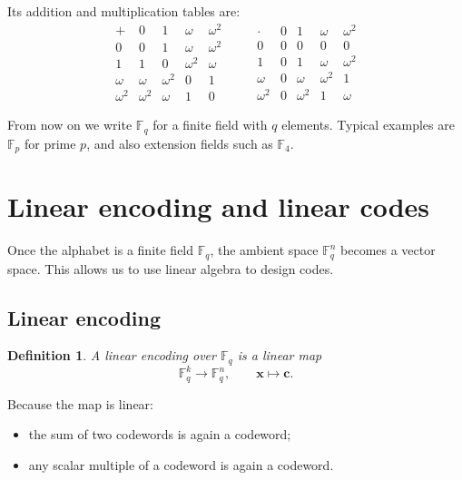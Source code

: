 \documentclass[11pt]{article}
\newtheorem{definition}{Definition}[section]
\newcommand{\F}{\mathbb{F}}
\newcommand{\vect}[1]{\bm{#1}}
\begin{document}
Its addition and multiplication tables are:
\[
\begin{array}{c|cccc}
+ & 0 & 1 & \omega & \omega^2 \\\hline
0 & 0 & 1 & \omega & \omega^2 \\
1 & 1 & 0 & \omega^2 & \omega \\
\omega & \omega & \omega^2 & 0 & 1 \\
\omega^2 & \omega^2 & \omega & 1 & 0
\end{array}
\qquad
\begin{array}{c|cccc}
\cdot & 0 & 1 & \omega & \omega^2 \\\hline
0 & 0 & 0 & 0 & 0 \\
1 & 0 & 1 & \omega & \omega^2 \\
\omega & 0 & \omega & \omega^2 & 1 \\
\omega^2 & 0 & \omega^2 & 1 & \omega
\end{array}
\]

\begin{summarybox}
From now on we write \(\F_q\) for a finite field with \(q\) elements. Typical examples are \(\F_p\) for prime \(p\), and also extension fields such as \(\F_4\).
\end{summarybox}

\section{Linear encoding and linear codes}

Once the alphabet is a finite field \(\F_q\), the ambient space \(\F_q^n\) becomes a vector space. This allows us to use linear algebra to design codes.

\subsection{Linear encoding}

\begin{definition}
A \emph{linear encoding} over \(\F_q\) is a linear map
\[
\F_q^k \longrightarrow \F_q^n,
\qquad
\vect{x}\longmapsto \vect{c}.
\]
\end{definition}

Because the map is linear:
\begin{itemize}
  \item the sum of two codewords is again a codeword;
  \item any scalar multiple of a codeword is again a codeword.
\end{itemize}
\end{document}
